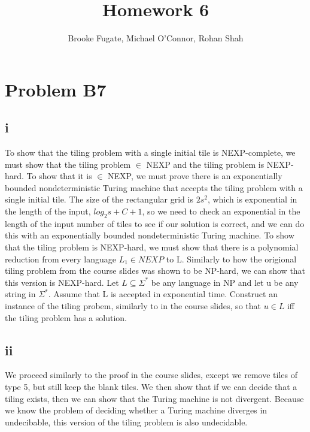 \documentclass[12pt]{article}
\begin{document}
\pagestyle{plain}
\titleformat{\subsection}[runin]
  {\normalfont\large\bfseries}{\thesubsection}{1em}{}
\titleformat{\subsubsection}[runin]
  {\bfseries}{}{1em}{}

\title{Homework 6}
\author{Brooke Fugate, Michael O'Connor, Rohan Shah}
\date{}

\maketitle

\section*{Problem B7}
\subsection*{i}
To show that the tiling problem with a single initial tile is NEXP-complete, we must show that the tiling problem $\in$ NEXP and the tiling problem is NEXP-hard. To show that it is $\in$ NEXP, we must prove there is an exponentially bounded nondeterministic Turing machine that accepts the tiling problem with a single initial tile. The size of the rectangular grid is $2s^2$, which is exponential in the length of the input, $log_2s+C+1$, so we need to check an exponential in the length of the input number of tiles to see if our solution is correct, and we can do this with an exponentially bounded nondeterministic Turing machine.
To show that the tiling problem is NEXP-hard, we must show that there is a polynomial reduction from every language $L_1 \in NEXP$ to L. Similarly to how the origional tiling problem from the course slides was shown to be NP-hard, we can show that this version is NEXP-hard.  Let $L \subseteq \Sigma^*$ be any language in NP and let u be any string in $\Sigma^*$. Assume that L is accepted in exponential time.  Construct an instance of the tiling probem, similarly to in the course slides, so that $u \in L$ iff the tiling problem has a solution.

\subsection*{ii} 
We proceed similarly to the proof in the course slides, except we remove tiles of type 5, but still keep the blank tiles.  We then show that if we can decide that a tiling exists, then we can show that the Turing machine is not divergent. Because we know the problem of deciding whether a Turing machine diverges in undecibable, this version of the tiling problem is also undecidable. 
\end{document}

